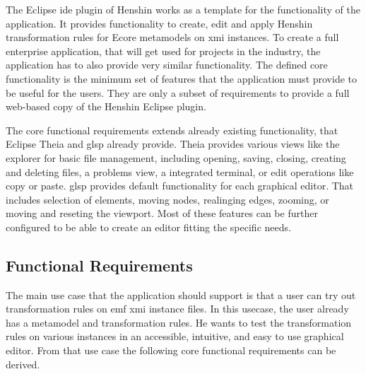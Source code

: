   The Eclipse \acs{ide} plugin of Henshin works as a template for the functionality of the application. It provides functionality to create, edit and apply Henshin transformation rules for Ecore metamodels on \ac{xmi} instances. To create a full enterprise application, that will get used for projects in the industry, the application has to also provide very similar functionality.
  The defined core functionality is the minimum set of features that the application must provide to be useful for the users. They are only a subset of requirements to provide a full web-based copy of the Henshin Eclipse plugin.

  The core functional requirements extends already existing functionality, that Eclipse Theia and \ac{glsp} already provide. Theia provides various views like the explorer for basic file management, including opening, saving, closing, creating and deleting files, a problems view, a integrated terminal, or edit operations like copy or paste. \ac{glsp} provides default functionality for each graphical editor. That includes selection of elements, moving nodes, realinging edges, zooming, or moving and reseting the viewport. Most of these features can be further configured to be able to create an editor fitting the specific needs.

  \subsection{Functional Requirements}
  \label{subsec:functional-requirements}

  The main use case that the application should support is that a user can try out transformation rules on \ac{emf} \ac{xmi} instance files. In this usecase, the user already has a metamodel and transformation rules. He wants to test the transformation rules on various instances in an accessible, intuitive, and easy to use graphical editor. From that use case the following core functional requirements can be derived.

